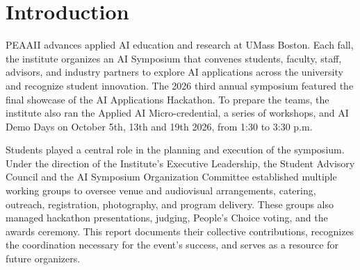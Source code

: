 \documentclass[sigconf,nonacm]{acmart}
\begin{document}

\maketitle

\section{Introduction}
PEAAII advances applied AI education and research at UMass Boston. Each fall, the institute organizes an AI Symposium that convenes students, faculty, staff, advisors, and industry partners to explore AI applications across the university and recognize student innovation. The 2026 third annual symposium featured the final showcase of the AI Applications Hackathon. To prepare the teams, the institute also ran the Applied AI Micro-credential, a series of workshops, and AI Demo Days on October 5th, 13th and 19th 2026, from 1:30 to 3:30 p.m.

Students played a central role in the planning and execution of the symposium. Under the direction of the Institute's Executive Leadership, the Student Advisory Council and the AI Symposium Organization Committee established multiple working groups to oversee venue and audiovisual arrangements, catering, outreach, registration, photography, and program delivery. These groups also managed hackathon presentations, judging, People’s Choice voting, and the awards ceremony. This report documents their collective contributions, recognizes the coordination necessary for the event's success, and serves as a resource for future organizers.

\end{document}
